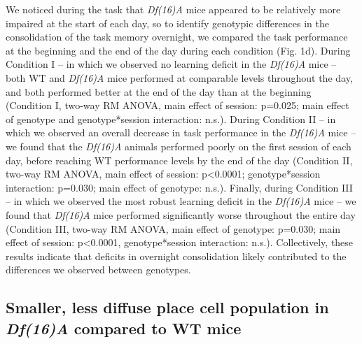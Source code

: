 We noticed during the task that \emph{Df(16)A\super{+/-}} mice appeared to be relatively more impaired at the start of each day, so to identify genotypic differences in the consolidation of the task memory overnight, we compared the task performance at the beginning and the end of the day during each condition (Fig. 1d). During Condition I – in which we observed no learning deficit in the \emph{Df(16)A\super{+/-}} mice – both WT and \emph{Df(16)A\super{+/-}} mice performed at comparable levels throughout the day, and both performed better at the end of the day than at the beginning (Condition I, two-way RM ANOVA, main effect of session: p=0.025; main effect of genotype and genotype*session interaction: n.s.). During Condition II – in which we observed an overall decrease in task performance in the \emph{Df(16)A\super{+/-}} mice –  we found that the \emph{Df(16)A\super{+/-}} animals performed poorly on the first session of each day, before reaching WT performance levels by the end of the day (Condition II, two-way RM ANOVA, main effect of session: p<0.0001; genotype*session interaction: p=0.030; main effect of genotype: n.s.). Finally, during Condition III – in which we observed the most robust learning deficit in the \emph{Df(16)A\super{+/-}} mice – we found that \emph{Df(16)A\super{+/-}} mice performed significantly worse throughout the entire day (Condition III, two-way RM ANOVA, main effect of genotype: p=0.030; main effect of session: p<0.0001, genotype*session interaction: n.s.). Collectively, these results indicate that deficits in overnight consolidation likely contributed to the differences we observed between genotypes.

\subsection{Smaller, less diffuse place cell population in \emph{Df(16)A\super{+/-}} compared to WT mice}

